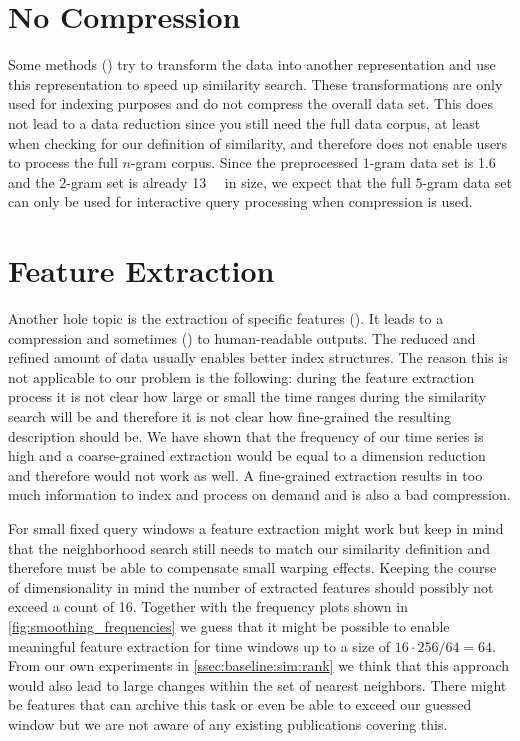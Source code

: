 \section{No Compression}
\label{sec:prior:nocompression}

Some methods (\cite{dimred3,dimred4}) try to transform the data into another representation and use this representation to speed up similarity search. These transformations are only used for indexing purposes and do not compress the overall data set. This does not lead to a data reduction since you still need the full data corpus, at least when checking for our definition of similarity, and therefore does not enable users to process the full $n$-gram corpus. Since the preprocessed $1$-gram data set is \SI{1.6}{\giga\byte} and the $2$-gram set is already \SI{13}{\giga\byte} in size, we expect that the full $5$-gram data set can only be used for interactive query processing when compression is used.



\section{Feature Extraction}
\label{sec:prior:extract}

Another hole topic is the extraction of specific features (\cite{compress1,compress2,compress3,compress4,compress5}). It leads to a compression and sometimes (\cite{compress1}) to human-readable outputs. The reduced and refined amount of data usually enables better index structures. The reason this is not applicable to our problem is the following: during the feature extraction process it is not clear how large or small the time ranges during the similarity search will be and therefore it is not clear how fine-grained the resulting description should be. We have shown that the frequency of our time series is high and a coarse-grained extraction would be equal to a dimension reduction and therefore would not work as well. A fine-grained extraction results in too much information to index and process on demand and is also a bad compression.

For small fixed query windows a feature extraction might work but keep in mind that the neighborhood search still needs to match our similarity definition and therefore must be able to compensate small warping effects. Keeping the course of dimensionality in mind the number of extracted features should possibly not exceed a count of \num{16}. Together with the frequency plots shown in \autoref{fig:smoothing_frequencies} we guess that it might be possible to enable meaningful feature extraction for time windows up to a size of $16 \cdot 256/64 = 64$. From our own experiments in \autoref{ssec:baseline:sim:rank} we think that this approach would also lead to large changes within the set of nearest neighbors. There might be features that can archive this task or even be able to exceed our guessed window but we are not aware of any existing publications covering this.



